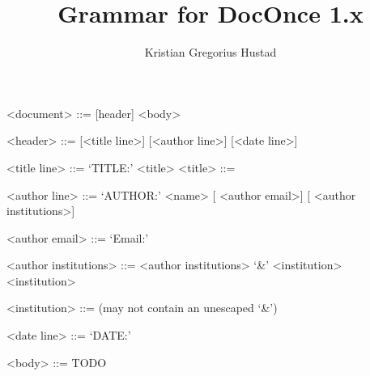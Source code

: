 \documentclass{article}
\begin{document}
\title{Grammar for DocOnce 1.x}
\author{Kristian Gregorius Hustad}
\maketitle

\setlength{\grammarparsep}{10pt plus 1pt minus 1pt} %
\setlength{\grammarindent}{12em} %
\begin{grammar}
<document>      ::= [header] <body>

<header>        ::= [<title line>] [<author line>] [<date line>]

<title line>    ::= `TITLE:'  <title> 
<title>         ::= 

<author line>   ::= `AUTHOR:'  <name>
                    [ <author email>]
                    [ <author institutions>]

<author email>  ::= `Email:'  

<author institutions>   ::= <author institutions>  `&'  <institution>
                        \alt <institution>

<institution>  ::=   (may not contain an unescaped `&')

<date line> ::= `DATE:'  

<body> ::= TODO
\end{grammar}
\end{document}
